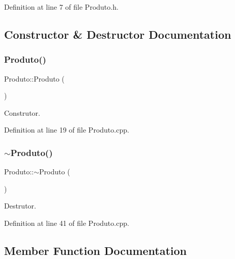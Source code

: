 Definition at line 7 of file Produto.\+h.



\subsection{Constructor \& Destructor Documentation}
\hypertarget{class_produto_adcd5834a1f04cc42fef88bf60217b8f4}{}\label{class_produto_adcd5834a1f04cc42fef88bf60217b8f4} 
\subsubsection{\texorpdfstring{Produto()}{Produto()}}
{\footnotesize\ttfamily Produto\+::\+Produto (\begin{DoxyParamCaption}{ }\end{DoxyParamCaption})}



Construtor. 



Definition at line 19 of file Produto.\+cpp.

\hypertarget{class_produto_a84a8b28176b743e8c74bfd89aee9a9b2}{}\label{class_produto_a84a8b28176b743e8c74bfd89aee9a9b2} 
\subsubsection{\texorpdfstring{$\sim$\+Produto()}{~Produto()}}
{\footnotesize\ttfamily Produto\+::$\sim$\+Produto (\begin{DoxyParamCaption}{ }\end{DoxyParamCaption})\hspace{0.3cm}{\ttfamily [virtual]}}



Destrutor. 



Definition at line 41 of file Produto.\+cpp.



\subsection{Member Function Documentation}
\hypertarget{class_produto_af4c6b062cf630f80c4064af0eed07486}{}\label{class_produto_af4c6b062cf630f80c4064af0eed07486} 

